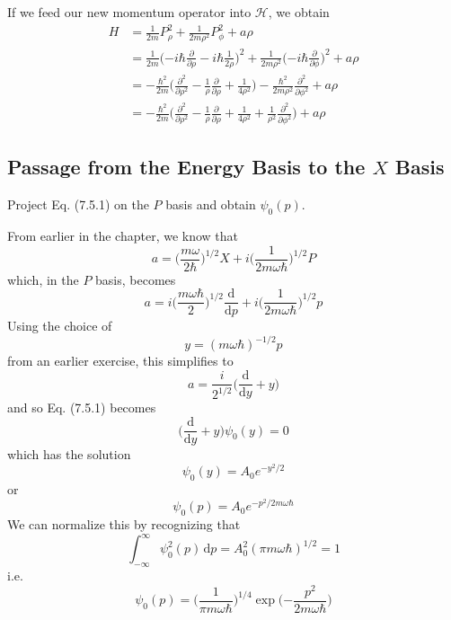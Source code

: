 \documentclass[../principles-of-quantum-mechanics.tex]{subfiles}
\begin{document}
\begin{questions}
\begin{solution}
			If we feed our new momentum operator into $\mathcal{H}$, we obtain
			\begin{align*}
				H &= \frac{1}{2m}P_\rho^2 + \frac{1}{2m\rho^2}P_\phi^2 + a\rho \\
				&= \frac{1}{2m}\Big({-i\hbar}\frac{\partial}{\partial\rho} - i\hbar\frac{1}{2\rho}\Big)^2 + \frac{1}{2m\rho^2}\Big({-i\hbar}\frac{\partial}{\partial\phi}\Big)^2 + a\rho \\
				&= {-\frac{\hbar^2}{2m}}\Big(\frac{\partial^2}{\partial\rho^2} - \frac{1}{\rho}\frac{\partial}{\partial\rho} + \frac{1}{4\rho^2}\Big) - \frac{\hbar^2}{2m\rho^2}\frac{\partial^2}{\partial\phi^2} + a\rho \\
				&= {-\frac{\hbar^2}{2m}}\Big(\frac{\partial^2}{\partial\rho^2} - \frac{1}{\rho}\frac{\partial}{\partial\rho} + \frac{1}{4\rho^2} + \frac{1}{\rho^2}\frac{\partial^2}{\partial\phi^2}\Big) + a\rho
			\end{align*}
		\end{solution}
		 
		\setcounter{subsection}{4}
		\setcounter{question}{0}
		\subsection{Passage from the Energy Basis to the $X$ Basis}
		\question Project Eq. (7.5.1) on the $P$ basis and obtain $\psi_0(p)$.
		\begin{solution}
			From earlier in the chapter, we know that
			$$a = \Big(\frac{m\omega}{2\hbar}\Big)^{1/2}X + i\Big(\frac{1}{2m\omega\hbar}\Big)^{1/2}P$$
			which, in the $P$ basis, becomes
			$$a = i\Big(\frac{m\omega\hbar}{2}\Big)^{1/2}\frac{\mathrm{d}}{\mathrm{d}p} + i\Big(\frac{1}{2m\omega\hbar}\Big)^{1/2}p$$
			Using the choice of 
			$$y = (m\omega\hbar)^{-1/2}p$$
			from an earlier exercise, this simplifies to
			$$a = \frac{i}{2^{1/2}}\Big(\frac{\mathrm{d}}{\mathrm{d}y} + y\Big)$$
			and so Eq. (7.5.1) becomes
			$$\Big(\frac{\mathrm{d}}{\mathrm{d}y} + y\Big)\psi_0(y) = 0$$
			which has the solution
			$$\psi_0(y) = A_0e^{-y^2/2}$$
			or
			$$\psi_0(p) = A_0e^{-p^2/2m\omega\hbar}$$
			We can normalize this by recognizing that
			$$\int_{-\infty}^{\infty} \psi_0^2(p)\,\mathrm{d}p = A_0^2(\pi m\omega\hbar)^{1/2} = 1$$
			i.e.
			$$\psi_0(p) = \Big(\frac{1}{\pi m\omega\hbar}\Big)^{1/4}\exp\Big({-\frac{p^2}{2m\omega\hbar}}\Big)$$
		\end{solution}
		

\end{questions}
\end{document}

